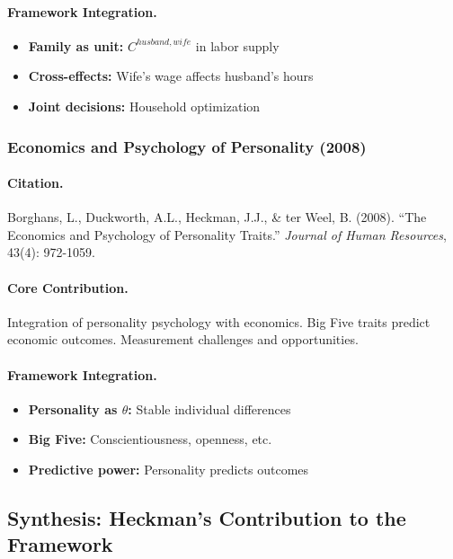 \documentclass[12pt,a4paper]{article}
\begin{document}
\paragraph{Framework Integration.}
\begin{itemize}
  \item \textbf{Family as unit:} $C^{husband,wife}$ in labor supply
  \item \textbf{Cross-effects:} Wife's wage affects husband's hours
  \item \textbf{Joint decisions:} Household optimization
\end{itemize}

\subsubsection{Economics and Psychology of Personality (2008)}

\paragraph{Citation.}
Borghans, L., Duckworth, A.L., Heckman, J.J., \& ter Weel, B. (2008).
``The Economics and Psychology of Personality Traits.''
\emph{Journal of Human Resources}, 43(4): 972-1059.

\paragraph{Core Contribution.}
Integration of personality psychology with economics. Big Five traits
predict economic outcomes. Measurement challenges and opportunities.

\paragraph{Framework Integration.}
\begin{itemize}
  \item \textbf{Personality as $\theta$:} Stable individual differences
  \item \textbf{Big Five:} Conscientiousness, openness, etc.
  \item \textbf{Predictive power:} Personality predicts outcomes
\end{itemize}

\subsection{Synthesis: Heckman's Contribution to the Framework}
\end{document}
